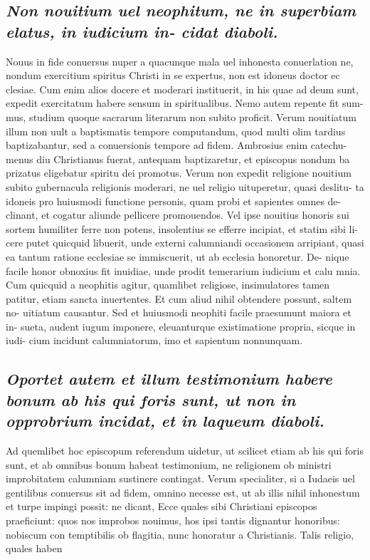 \documentclass{article}
\begin{document}
\begin{pages}
\subsection*{\textit{Non nouitium uel neophitum, ne in superbiam elatus, in iudicium in- cidat diaboli. }}\pstart Nouus in fide conuersus nuper a quacunque mala uel inhonesta conuerlation ne, nondum exercitium spiritus Christi in se expertus, non est idoneus doctor ec clesiae. Cum enim alios docere et moderari instituerit, in his quae ad deum sunt, expedit exercitatum habere sensum in spiritualibus. Nemo autem repente fit sum- mus, studium quoque sacrarum literarum non subito proficit. Verum nouitiatum illum non uult a baptismatis tempore computandum, quod multi olim tardius baptizabantur, sed a conuersionis tempore ad fidem. Ambrosius enim catechu- menus diu Christianus fuerat, antequam baptizaretur, et episcopus nondum ba prizatus eligebatur spiritu dei promotus. Verum non expedit religione nouitium subito gubernacula religionis moderari, ne uel religio uituperetur, quasi deslitu- ta idoneis pro huiusmodi functione personis, quam probi et sapientes omnes de- clinant, et cogatur aliunde pellicere promouendos. Vel ipse nouitius honoris sui sortem humiliter ferre non potens, insolentius se efferre incipiat, et statim sibi li- cere putet quicquid libuerit, unde externi calumniandi occasionem arripiant, quasi ea tantum ratione ecclesiae se immiscuerit, ut ab ecclesia honoretur. De- nique facile honor obnoxius fit inuidiae, unde prodit temerarium iudicium et calu mnia. Cum quicquid a neophitis agitur, quamlibet religiose, insimulatores tamen patitur, etiam sancta inuertentes. Et cum aliud nihil obtendere possunt, saltem no- uitiatum causantur. Sed et huiusmodi neophiti facile praesumunt maiora et in- sueta, audent iugum imponere, eleuanturque existimatione propria, sicque in iudi- cium incidunt calumniatorum, imo et sapientum nonnunquam.  \pend
{}
{}
\subsection*{\textit{Oportet autem et illum testimonium habere bonum ab his qui foris sunt, ut non in opprobrium incidat, et in laqueum diaboli. }}\pstart Ad quemlibet hoc episcopum referendum uidetur, ut scilicet etiam ab his qui foris sunt, et ab omnibus bonum habeat testimonium, ne religionem ob ministri improbitatem calumniam sustinere contingat. Verum specialiter, si a Iudaeis uel gentilibus conuersus sit ad fidem, omnino necesse est, ut ab illis nihil inhonestum et turpe impingi possit: ne dicant, Ecce quales sibi Christiani episcopos praeficiunt: quos nos improbos nouimus, hos ipsi tantis dignantur honoribus: nobiscum con temptibilis ob flagitia, nunc honoratur a Christianis. Talis religio, quales haben  \pend

\end{pages}
\end{document}
